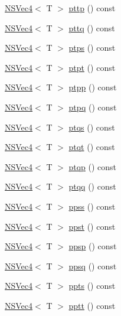 \begin{DoxyCompactItemize}
\item 
\hyperlink{structNSVec4}{N\-S\-Vec4}$<$ T $>$ \hyperlink{structNSVec4_acd9d3b0f7b6738de687e03e7eca9f197}{pttp} () const 
\item 
\hyperlink{structNSVec4}{N\-S\-Vec4}$<$ T $>$ \hyperlink{structNSVec4_a8eeba27abc08f450b5713b9a69d23ca1}{pttq} () const 
\item 
\hyperlink{structNSVec4}{N\-S\-Vec4}$<$ T $>$ \hyperlink{structNSVec4_a32350a78c3c0e1694b489e604c29946c}{ptps} () const 
\item 
\hyperlink{structNSVec4}{N\-S\-Vec4}$<$ T $>$ \hyperlink{structNSVec4_a11b0738057331ab3b176f39ce9fd39f5}{ptpt} () const 
\item 
\hyperlink{structNSVec4}{N\-S\-Vec4}$<$ T $>$ \hyperlink{structNSVec4_a12f7693aa505383df989496764bde06c}{ptpp} () const 
\item 
\hyperlink{structNSVec4}{N\-S\-Vec4}$<$ T $>$ \hyperlink{structNSVec4_a086756209d8ea0c26537b962520b770c}{ptpq} () const 
\item 
\hyperlink{structNSVec4}{N\-S\-Vec4}$<$ T $>$ \hyperlink{structNSVec4_a4b6f439663cfd67cbaa7da3e34fab1cb}{ptqs} () const 
\item 
\hyperlink{structNSVec4}{N\-S\-Vec4}$<$ T $>$ \hyperlink{structNSVec4_ac7565f67148463d58b2be9b63fdf062f}{ptqt} () const 
\item 
\hyperlink{structNSVec4}{N\-S\-Vec4}$<$ T $>$ \hyperlink{structNSVec4_a6dbd836859741c17435d8ddcaec2f943}{ptqp} () const 
\item 
\hyperlink{structNSVec4}{N\-S\-Vec4}$<$ T $>$ \hyperlink{structNSVec4_a86225f50ff0d3e1ae443629825109a6b}{ptqq} () const 
\item 
\hyperlink{structNSVec4}{N\-S\-Vec4}$<$ T $>$ \hyperlink{structNSVec4_ace2c24f79c90de72add4fd310c5e1b3b}{ppss} () const 
\item 
\hyperlink{structNSVec4}{N\-S\-Vec4}$<$ T $>$ \hyperlink{structNSVec4_a3110f0f140a2c9354509cdd469fd1b20}{ppst} () const 
\item 
\hyperlink{structNSVec4}{N\-S\-Vec4}$<$ T $>$ \hyperlink{structNSVec4_aee4612e43ebe1ab299817adb2a64ee25}{ppsp} () const 
\item 
\hyperlink{structNSVec4}{N\-S\-Vec4}$<$ T $>$ \hyperlink{structNSVec4_acbbdb92f3d08075698a9cce285d24fac}{ppsq} () const 
\item 
\hyperlink{structNSVec4}{N\-S\-Vec4}$<$ T $>$ \hyperlink{structNSVec4_acc88ba2ffde2e1ad592fd57b217c6708}{ppts} () const 
\item 
\hyperlink{structNSVec4}{N\-S\-Vec4}$<$ T $>$ \hyperlink{structNSVec4_a4665ee1b7ccf67003e5fd2789450bb2e}{pptt} () const 

\end{DoxyCompactItemize}
